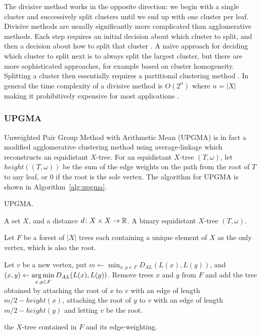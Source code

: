 The divisive method works in the opposite direction: we begin with a single
cluster and successively split clusters until we end up with one cluster per
leaf.  Divisive methods are usually significantly more complicated than
agglomerative methods.  Each step requires an initial decision about which
cluster to split, and then a decision about how to split that cluster
\cite{savaresi2002cluster}.  A naïve approach for deciding which cluster to
split next is to always split the largest cluster, but there are more
sophisticated approaches, for example based on cluster homogeneity.  Splitting
a cluster then essentially requires a partitional clustering method
\cite{ding2002cluster}.  In general the time complexity of a divisive method
is $O(2^n)$ where $n = |X|$ making it prohibitively expensive for most
applications \cite{cimiano2004comparing}.

\subsubsection{UPGMA}
\label{sec:upgma}

Unweighted Pair Group Method with Arithmetic Mean (UPGMA)
\cite{sokal1958statistical} is in fact a modified agglomerative clustering
method using average-linkage which reconstructs an equidistant $X$-tree.  For
an equidistant $X$-tree $(T,\omega)$, let $height((T,\omega))$ be the sum of
the edge weights on the path from the root of $T$ to any leaf, or 0 if the
root is the sole vertex.  The algorithm for UPGMA is shown in
Algorithm~\ref{alg:upgma}.

\begin{algorithm}[h]
  \caption{UPGMA.}
  \label{alg:upgma}

  \begin{algorithmic}
    \Require A set $X$, and a distance $d \colon X \times X \to {\mathbb R}$.
    \Ensure  A binary equidistant $X$-tree $(T, \omega)$.

    \State Let $F$ be a forest of $|X|$ trees each containing a unique element
    of $X$ as the only vertex, which is also the root.


       \State Let $v$ be a new vertex,
       \State put $\displaystyle m \gets \min_{x,y \in F} D_{AL}(L(x),L(y))$,
       \State and $\displaystyle (x,y) \gets \operatorname*{arg\,min}_{x,y \in F} D_{AL}(L(x),L(y))$.
       \State Remove trees $x$ and $y$ from $F$ and add the tree obtained by
         attaching the root of $x$ to $v$ with an edge of length $m/2 -
         height(x)$, attaching the root of $y$ to $v$ with an edge of length
         $m/2 - height(y)$ and letting $v$ be the root.
    
    \EndWhile

    \State \Return the $X$-tree contained in $F$ and its edge-weighting.
  \end{algorithmic}
\end{algorithm}

